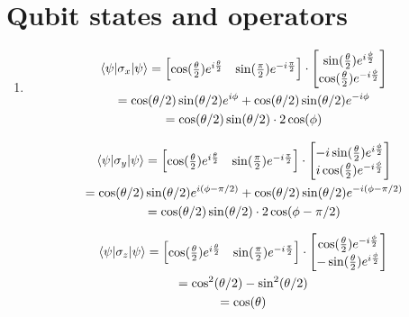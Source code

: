 \documentclass[12pt]{article}
\begin{document}
\section{Qubit states and operators}

\begin{enumerate}

\item
\begin{multline}
\langle \psi | \sigma_x |\psi \rangle =
\begin{bmatrix}
\cos(\frac{\theta}{2})e^{i\frac{\theta}{2}} & \sin(\frac{\pi}{2})e^{-i\frac{\pi}{2}}\\
\end{bmatrix}
\cdot
\begin{bmatrix}
\sin(\frac{\theta}{2})e^{i\frac{\phi}{2}}\\
\cos(\frac{\theta}{2})e^{-i\frac{\phi}{2}}\\
\end{bmatrix}\\
= \cos(\theta/2)\sin(\theta/2)e^{i\phi} + \cos(\theta/2)\sin(\theta/2)e^{-i\phi}\\
= \cos(\theta/2)\sin(\theta/2)\cdot 2\cos(\phi)
\end{multline}

\begin{multline}
\langle \psi | \sigma_y |\psi \rangle =
\begin{bmatrix}
\cos(\frac{\theta}{2})e^{i\frac{\theta}{2}} & \sin(\frac{\pi}{2})e^{-i\frac{\pi}{2}}\\
\end{bmatrix}
\cdot
\begin{bmatrix}
-i \sin(\frac{\theta}{2})e^{i\frac{\phi}{2}}\\
i \cos(\frac{\theta}{2})e^{-i\frac{\phi}{2}}\\
\end{bmatrix}\\
= \cos(\theta/2)\sin(\theta/2)e^{i(\phi-\pi/2)} + \cos(\theta/2)\sin(\theta/2)e^{-i(\phi - \pi/2)}\\
= \cos(\theta/2)\sin(\theta/2)\cdot 2\cos(\phi - \pi/2)
\end{multline}

\begin{multline}
\langle \psi | \sigma_z |\psi \rangle =
\begin{bmatrix}
\cos(\frac{\theta}{2})e^{i\frac{\theta}{2}} & \sin(\frac{\pi}{2})e^{-i\frac{\pi}{2}}\\
\end{bmatrix}
\cdot
\begin{bmatrix}
\cos(\frac{\theta}{2})e^{-i\frac{\phi}{2}}\\
-\sin(\frac{\theta}{2})e^{i\frac{\phi}{2}}\\
\end{bmatrix}\\
= \cos^2(\theta/2) - \sin^2(\theta/2)\\
= \cos(\theta)
\end{multline}


\end{enumerate}
\end{document}
